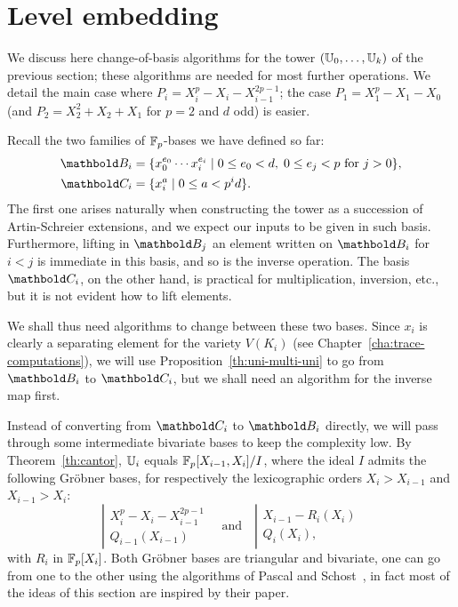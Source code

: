 

\section{Level embedding}
\label{sec:level-embedding}

We discuss here change-of-basis algorithms for the tower $(\mathbb{U}_0,
\ldots, \mathbb{U}_k)$ of the previous section; these algorithms are needed
for most further operations. We detail the main case where $P_i =
X_i^p - X_i - X_{i-1}^{2p-1}$; the case $P_1= X_1^p - X_1 - X_0$ (and
$P_2=X_2^2+X_2+X_1$ for $p=2$ and $d$ odd) is easier.

Recall the two families of $\mathbb{F}_p$-bases we have defined so far:
\begin{align}
  \pdfmctwo{Explicit indices for the basis.}
  \basis{B}_i &=
  \{x_0^{e_0} \cdots x_i^{e_i} \;|\; 0 \le e_0 < d,\; 0\le e_j < p 
  \text{ for $j>0$}\}
  \text{,}\\
  \basis{C}_i&=\{x_i^a \;|\; 0\le a<p^id\}
  \text{.}  
\end{align}
The first one arises naturally when constructing the tower as a
succession of Artin-Schreier extensions, and we expect our inputs to
be given in such basis. Furthermore, lifting in $\basis{B}_j$ an
element written on $\basis{B}_i$ for $i<j$ is immediate in this basis,
and so is the inverse operation. The basis $\basis{C}_i$, on the
other hand, is practical for multiplication, inversion, etc., but it
is not evident how to lift elements.

We shall thus need algorithms to change between these two bases. Since
$x_i$ is clearly a separating element for the variety $V(K_i)$ (see
Chapter~\ref{cha:trace-computations}), we will use
Proposition~\ref{th:uni-multi-uni} to go from $\basis{B}_i$ to
$\basis{C}_i$, but we shall need an algorithm for the inverse map first.

Instead of converting from $\basis{C}_i$ to $\basis{B}_i$ directly, we
will pass through some intermediate bivariate bases to keep the
complexity low. By Theorem~\ref{th:cantor}, $\mathbb{U}_i$ equals
$\mathbb{F}_p[X_{i-1},X_i]/I$, where the ideal $I$ admits the following
Gr{\"o}bner bases, for respectively the lexicographic orders
$X_i>X_{i-1}$ and $X_{i-1}>X_i$:
\begin{equation}
  \left |
  \begin{array}{rl}
    X_i^p - X_i - X_{i-1}^{2p-1} \\
    Q_{i-1}(X_{i-1})         
  \end{array}
\right.
  \quad \text{and}\quad
  \left |
  \begin{array}{rl}
    X_{i-1} - R_i(X_i) \\
    Q_i(X_i),
  \end{array}
\right.
\end{equation}
with $R_i$ in $\mathbb{F}_p[X_i]$. Both Gröbner bases are triangular and
bivariate, one can go from one to the other using the algorithms of
Pascal and Schost~\cite{pascal+schost06}, in fact most of the ideas of
this section are inspired by their paper.

